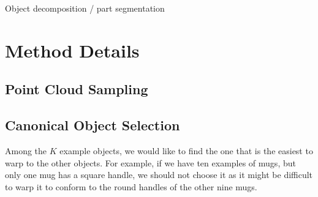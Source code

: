 \documentclass{article}
\begin{document}
Object decomposition / part segmentation \cite{tenorth13Decomposing,vahrenkamp16Partbased,chen22Neural}


\clearpage



\clearpage
\appendix

\section{Method Details}
\label{appendix:method}

\subsection{Point Cloud Sampling}
\label{appendix:method:sampling}



\subsection{Canonical Object Selection}
\label{appendix:method:canonical}

Among the $K$ example objects, we would like to find the one that is the easiest to warp to the other objects. For example, if we have ten examples of mugs, but only one mug has a square handle, we should not choose it as it might be difficult to warp it to conform to the round handles of the other nine mugs.
\end{document}
